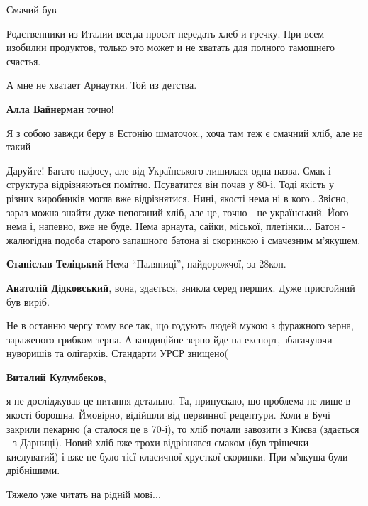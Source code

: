 \begin{itemize}
Смачий був

Родственники из Италии всегда просят передать хлеб и гречку. При всем изобилии
продуктов, только это может и не хватать для полного тамошнего счастья.

А мне не хватает Арнаутки. Той из детства.

\textbf{Алла Вайнерман} точно!

Я з собою завжди беру в Естонію шматочок., хоча там теж є смачний хліб, але не такий


Даруйте! Багато пафосу, але від Українського лишилася одна назва. Смак і
структура відрізняються помітно. Псуватится він почав у 80-і. Тоді якість у
різних виробників могла вже відрізнятися. Нині, якості нема ні в кого.. Звісно,
зараз можна знайти дуже непоганий хліб, але це, точно - не український. Його
нема і, напевно, вже не буде. Нема арнаута, сайки, міської, плетінки... Батон -
жалюгідна подоба старого запашного батона зі скоринкою і смачезним м'якушем.

\begin{itemize} %
\textbf{Станіслав Теліцький} Нема \enquote{Паляниці}, найдорожчої, за 28коп.

\textbf{Анатолій Дідковський}, вона, здається, зникла серед перших. Дуже пристойний був виріб.


Не в останню чергу тому все так, що годують людей мукою з фуражного зерна,
зараженого грибком зерна. А кондиційне зерно йде на експорт, збагачуючи
нуворишів та олігархів. Стандарти УРСР знищено(


\textbf{Виталий Кулумбеков}, 

я не досліджував це питання детально. Та, припускаю, що проблема не лише в
якості борошна. Ймовірно, відійшли від первинної рецептури. Коли в Бучі закрили
пекарню (а сталося це в 70-і), то хліб почали завозити з Києва (здається - з
Дарниці). Новий хліб вже трохи відрізнявся смаком (був трішечки кислуватий) і
вже не було тієї класичної хрусткої скоринки. При м'якуша були дрібнішими.

\end{itemize} %

Тяжело уже читать на рiднiй мовi...


\end{itemize}
